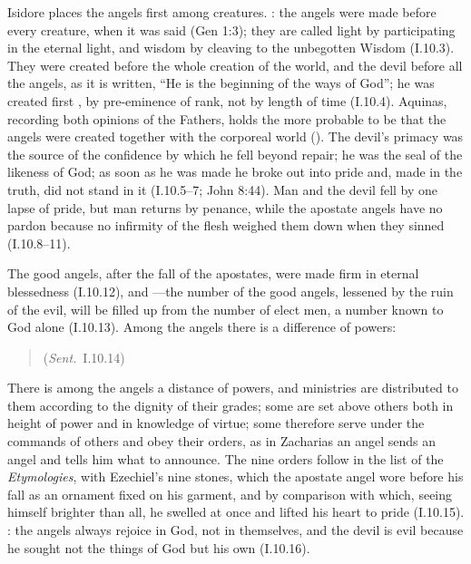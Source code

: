 Isidore places the angels first among creatures. : the angels were made before
every creature, when it was said  (Gen 1:3); they are
called light by participating in the eternal light, and wisdom by cleaving to
the unbegotten Wisdom (I.10.3). They were created before the whole creation
of the world, and the devil before all the angels, as it is written, ``He is
the beginning of the ways of God''; he was created first , by pre-eminence of rank, not by length
of time (I.10.4). Aquinas, recording both opinions of the Fathers, holds the
more probable to be that the angels were created together with the corporeal
world (). The devil's primacy was the source of the
confidence by which he fell beyond repair; he was the seal of the likeness of
God; as soon as he was made he broke out into pride and, made in the truth,
did not stand in it (I.10.5--7; John 8:44). Man and the devil fell by one
lapse of pride, but man returns by penance, while the apostate angels have no
pardon because no infirmity of the flesh weighed them down when they sinned
(I.10.8--11).

The good angels, after the fall of the apostates, were made firm in eternal
blessedness (I.10.12), and ---the number of the good angels, lessened by
the ruin of the evil, will be filled up from the number of elect men, a number
known to God alone (I.10.13). Among the angels there is a difference of
powers:

\begin{quote}
 (\emph{Sent.}\ I.10.14)
\end{quote}

\noindent There is among the angels a distance of powers, and ministries are
distributed to them according to the dignity of their grades; some are set
above others both in height of power and in knowledge of virtue; some
therefore serve under the commands of others and obey their orders, as in
Zacharias an angel sends an angel and tells him what to announce. The nine
orders follow in the list of the \emph{Etymologies}, with Ezechiel's nine
stones, which the apostate angel wore before his fall as an ornament fixed on
his garment, and by comparison with which, seeing himself brighter than all,
he swelled at once and lifted his heart to pride (I.10.15). : the angels always rejoice in God, not in
themselves, and the devil is evil because he sought not the things of God but
his own (I.10.16).

